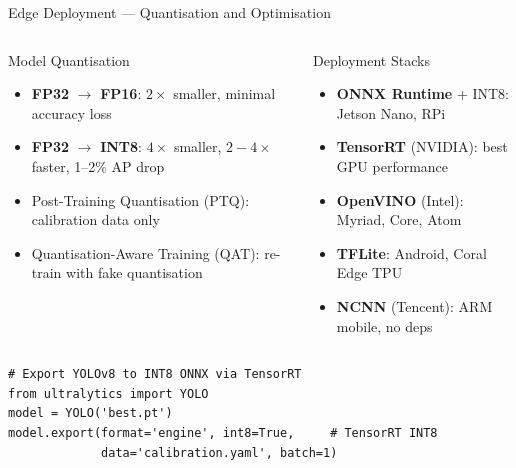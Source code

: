 \documentclass[aspectratio=169]{beamer}
\begin{document}
\begin{frame}{Edge Deployment — Quantisation and Optimisation}
  \begin{columns}
    \begin{block}{Model Quantisation}
      \begin{itemize}
        \item \textbf{FP32} $\rightarrow$ \textbf{FP16}: $2\times$ smaller, minimal accuracy loss
        \item \textbf{FP32} $\rightarrow$ \textbf{INT8}: $4\times$ smaller, $2{-}4\times$ faster, 1--2\% AP drop
        \item Post-Training Quantisation (PTQ): calibration data only
        \item Quantisation-Aware Training (QAT): re-train with fake quantisation
      \end{itemize}
    \end{block}
    \begin{block}{Deployment Stacks}
      \begin{itemize}
        \item \textbf{ONNX Runtime} + INT8: Jetson Nano, RPi
        \item \textbf{TensorRT} (NVIDIA): best GPU performance
        \item \textbf{OpenVINO} (Intel): Myriad, Core, Atom
        \item \textbf{TFLite}: Android, Coral Edge TPU
        \item \textbf{NCNN} (Tencent): ARM mobile, no deps
      \end{itemize}
    \end{block}
  \end{columns}
  \begin{lstlisting}[basicstyle=\ttfamily\scriptsize]
# Export YOLOv8 to INT8 ONNX via TensorRT
from ultralytics import YOLO
model = YOLO('best.pt')
model.export(format='engine', int8=True,     # TensorRT INT8
             data='calibration.yaml', batch=1)
  \end{lstlisting}
\end{frame}
\end{document}
